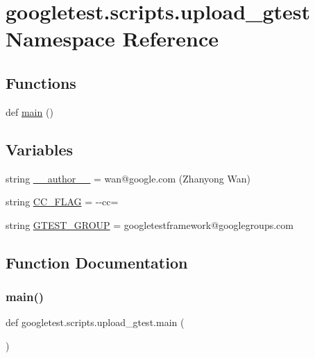 \hypertarget{namespacegoogletest_1_1scripts_1_1upload__gtest}{}\section{googletest.\+scripts.\+upload\+\_\+gtest Namespace Reference}
\label{namespacegoogletest_1_1scripts_1_1upload__gtest}
\subsection*{Functions}
\begin{DoxyCompactItemize}
\item 
def \mbox{\hyperlink{namespacegoogletest_1_1scripts_1_1upload__gtest_ab2cfb3d877cd780bf82d715b56efc9a8}{main}} ()
\end{DoxyCompactItemize}
\subsection*{Variables}
\begin{DoxyCompactItemize}
\item 
string \mbox{\hyperlink{namespacegoogletest_1_1scripts_1_1upload__gtest_a14f57871ae0851dab49635e3524d9dd7}{\+\_\+\+\_\+author\+\_\+\+\_\+}} = \textquotesingle{}wan@google.\+com (Zhanyong Wan)\textquotesingle{}
\item 
string \mbox{\hyperlink{namespacegoogletest_1_1scripts_1_1upload__gtest_a76fe5d4decd1d821b3be7ad0cb53ab95}{C\+C\+\_\+\+F\+L\+AG}} = \textquotesingle{}-\/-\/cc=\textquotesingle{}
\item 
string \mbox{\hyperlink{namespacegoogletest_1_1scripts_1_1upload__gtest_aeab70fa3638847e87bb2ba053cc14107}{G\+T\+E\+S\+T\+\_\+\+G\+R\+O\+UP}} = \textquotesingle{}googletestframework@googlegroups.\+com\textquotesingle{}
\end{DoxyCompactItemize}


\subsection{Function Documentation}
\mbox{\label{namespacegoogletest_1_1scripts_1_1upload__gtest_ab2cfb3d877cd780bf82d715b56efc9a8}} 
\subsubsection{\texorpdfstring{main()}{main()}}
{\footnotesize\ttfamily def googletest.\+scripts.\+upload\+\_\+gtest.\+main (\begin{DoxyParamCaption}{ }\end{DoxyParamCaption})}



